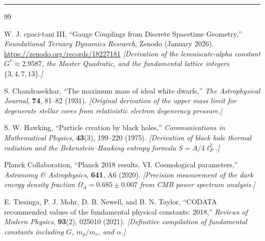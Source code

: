 \documentclass[11pt, letterpaper]{article}
\newcommand{\G}{G^*}
\theoremstyle{definition}
\theoremstyle{remark}
\begin{document}
\vspace{2em}
\hrule
\vspace{1.5em}

\begin{thebibliography}{99}

W. J. cpaci-tani III,
``Gauge Couplings from Discrete Spacetime Geometry,''
\textit{Foundational Ternary Dynamics Research}, Zenodo (January 2026).
\url{https://zenodo.org/records/18227181}
\newblock \textit{[Derivation of the lemniscate-alpha constant $\G \approx 2.9587$, the Master Quadratic, and the fundamental lattice integers $\{3, 4, 7, 13\}$.]}

S. Chandrasekhar,
``The maximum mass of ideal white dwarfs,''
\textit{The Astrophysical Journal}, \textbf{74}, 81--82 (1931).
\newblock \textit{[Original derivation of the upper mass limit for degenerate stellar cores from relativistic electron degeneracy pressure.]}

S. W. Hawking,
``Particle creation by black holes,''
\textit{Communications in Mathematical Physics}, \textbf{43}(3), 199--220 (1975).
\newblock \textit{[Derivation of black hole thermal radiation and the Bekenstein--Hawking entropy formula $S = A / 4\ell_P^2$.]}

Planck Collaboration,
``Planck 2018 results. VI. Cosmological parameters,''
\textit{Astronomy \& Astrophysics}, \textbf{641}, A6 (2020).
\newblock \textit{[Precision measurement of the dark energy density fraction $\Omega_\Lambda = 0.685 \pm 0.007$ from CMB power spectrum analysis.]}

E. Tiesinga, P. J. Mohr, D. B. Newell, and B. N. Taylor,
``CODATA recommended values of the fundamental physical constants: 2018,''
\textit{Reviews of Modern Physics}, \textbf{93}(2), 025010 (2021).
\newblock \textit{[Definitive compilation of fundamental constants including $G$, $m_p/m_e$, and $\alpha$.]}

\end{thebibliography}
\end{document}
